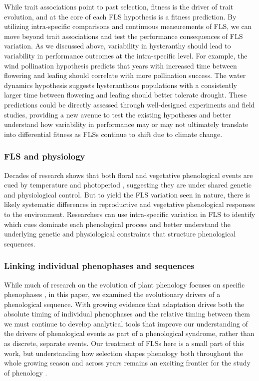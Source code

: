 \documentclass[12pt]{article}
\begin{document}
\noindent While trait associations point to past selection, fitness is the driver of trait evolution, and at the core of each FLS hypothesis is a fitness prediction. By utilizing intra-specific comparisons and continuous measurements of FLS, we can move beyond trait associations and test the performance consequences of FLS variation. As we discussed above, variability in hysteranthy should lead to variability in performance outcomes at the intra-specific level. For example, the wind pollination hypothesis predicts that years with increased time between flowering and leafing should correlate with more pollination success. The water dynamics hypothesis suggests hysteranthous populations with a consistently larger time between flowering and leafing should better tolerate drought. These predictions could be directly assessed through well-designed experiments and field studies, providing a new avenue to test the existing hypotheses and better understand how variability in performance may or may not ultimately translate into differential fitness as FLSs continue to shift due to climate change.

\subsubsection*{FLS and physiology} 
\noindent Decades of research shows that both floral and vegetative phenological events are cued by temperature and photoperiod \citep{Forrest2010}, suggesting they are under shared genetic and physiological control. But to yield the FLS variation seen in nature, there is likely systematic differences in reproductive and vegetative phenological responses to the environment. Researchers can use intra-specific variation in FLS to identify which cues dominate each phenological process and better understand the underlying genetic and physiological constraints that structure phenological sequences.

\subsubsection*{Linking individual phenophases and sequences}
\noindent While much of research on the evolution of plant phenology focuses on specific phenophases  \citep[e.g.][]{Savage2013,OLLERTON_1992}, in this paper, we examined the evolutionary drivers of a phenological sequence. With growing evidence that adaptation drives both the absolute timing of individual phenophases and the relative timing between them we must continue to develop analytical tools that improve our understanding of the drivers of phenological events as part of a phenological syndrome, rather than as discrete, separate events. 
Our treatment of FLSs here is a small part of this work, but understanding how selection shapes phenology both throughout the whole growing season and across years remains an exciting frontier for the study of phenology \citep{Wolkovich2014b}.
\end{document}
